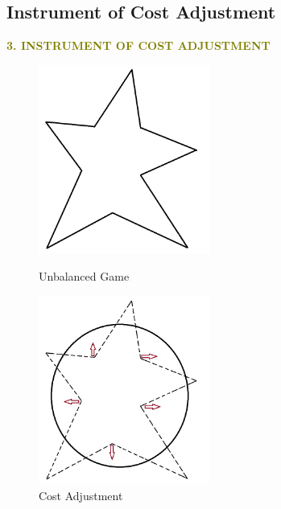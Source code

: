 \documentclass[14pt]{beamer}
\begin{document}
\subsection{Instrument of Cost Adjustment}
\begin{frame}
\centering
\normalsize
\textcolor{olive}{\bf {\LARGE 3.} \bf {\LARGE I}NSTRUMENT OF {\bf {\LARGE C}}OST {\bf {\LARGE A}}DJUSTMENT}
\vspace{5mm}
\begin{figure}[H]
\centering
\begin{minipage}[t]{0.32\textwidth}
\centering
\includegraphics[width=0.5\textwidth]{conculsion1.png}
\caption*{Unbalanced Game}
\end{minipage}
\begin{minipage}[t]{0.32\textwidth}
\centering
\includegraphics[width=0.5\textwidth]{conculsion5.png}
\caption*{Cost Adjustment}
\end{minipage}
\end{figure}
\vspace{-15mm}
\end{frame}
\end{document}
